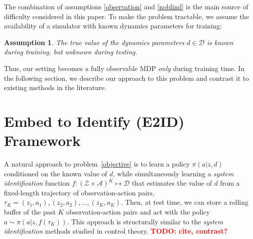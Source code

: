 \documentclass{article}
\newcommand{\TODO}[1]{\textcolor{red}{\textbf{TODO: #1}}}
\newcommand{\cA}{\mathcal{A}}
\newcommand{\sysid}{dynamics}
\newcommand{\obset}{\mathcal{Z}}
\newcommand{\idset}{\mathcal{D}}
\newcommand{\obvar}{z}
\newcommand{\idvar}{d}
\newcommand{\idpdf}{p_{\idset}}
\newtheorem{assumption}[theorem]{Assumption}
\begin{document}
The combination of assumptions \ref{observation} and \ref{noblind} is the main source of difficulty considered in this paper.
To make the problem tractable, we assume the availability of a simulator with known \sysid{} parameters for training:
\begin{assumption}
The true value of the \sysid{} parameters $\idvar \in \idset$ is known during training, but unknown during testing.
\label{known-unknown}
\end{assumption}
Thus, our setting becomes a fully observable MDP \emph{only} during training time.
In the following section, we describe our approach to this problem
and contrast it to existing methods in the literature.


\section{Embed to Identify (E2ID) Framework}
A natural approach to problem~\eqref{objective} is to learn a policy $\pi(a|\obvar,\idvar)$ conditioned on the known value of $\idvar$,
while simultaneously learning a \emph{system identification} function $f : (\obset \times \cA)^K \mapsto \idset$
that estimates the value of $\idvar$
from a fixed-length trajectory of observation-action pairs, $\tau_K = (\obvar_1, a_1), (\obvar_2, a_2), \dots, (\obvar_K, a_K)$.
Then, at test time, we can store a rolling buffer of the past $K$ observation-action pairs
and act with the policy $a \sim \pi(a|\obvar, f(\tau_K))$.
This approach is structurally similar to the \emph{system identification} methods studied in control theory. \TODO{cite, contrast?}
\end{document}
